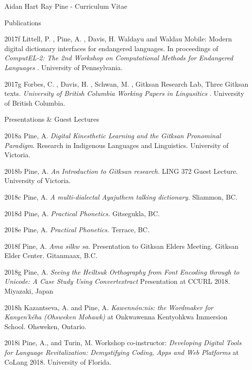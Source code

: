 \documentclass[12pt]{letter}
\begin{document}
\begin{cv}{ Aidan Hart Ray Pine  \space - \space   Curriculum Vitae}
\begin{cvlist}{Publications}
                                                            \item[2017f]  Littell,  P. ,  Pine,  A. ,  Davis,  H.   Waldayu and Waldau Mobile: Modern digital dictionary interfaces for endangered languages. In proceedings of \textit{ ComputEL-2: The 2nd Workshop on Computational Methods for Endangered Languages }. University of Pennsylvania.  
                                                            \item[2017g]  Forbes,  C. ,  Davis,  H. ,  Schwan,  M. ,  Gitksan Research Lab,    Three Gitksan texts. \textit{ University of British Columbia Working Papers in Lingusitics }. University of British Columbia.  
                                \end{cvlist}

        \begin{cvlist}{Presentations \& Guest Lectures}
            \item[2018a] Pine, A. \textit{Digital Kinesthetic Learning and the Gitksan Pronominal Paradigm}. Research in Indigenous Languages and Linguistics. University of Victoria.
            \item[2018b] Pine, A. \textit{An Introduction to Gitksan research.} LING 372 Guest Lecture. University of Victoria.
            \item[2018c] Pine, A. \textit{A multi-dialectal Ayajuthem talking dictionary.} Sliammon, BC.
            \item[2018d] Pine, A. \textit{Practical Phonetics.} Gitsegukla, BC.
            \item[2018e] Pine, A. \textit{Practical Phonetics.} Terrace, BC.
            \item[2018f] Pine, A. \textit{Ama silkw sa.} Presentation to Gitksan Elders Meeting. Gitksan Elder Center. Gitanmaax, B.C.
            \item[2018g] Pine, A. \textit{Seeing the Heiltsuk Orthography from Font Encoding through to Unicode: A Case Study Using Convertextract} Presentation at CCURL 2018. Miyazaki, Japan
            \item[2018h] Kazantseva, A. and Pine, A. \textit{Kawenn\'{o}n:nis: the Wordmaker for Kanyen'k\'{e}ha (Ohsweken Mohawk)} at Onkwawenna Kentyohkwa Immersion School. Ohsweken, Ontario.
            \item[2018i] Pine, A., and Turin, M. Workshop co-instructor: \textit{Developing Digital Tools for Language Revitalization: Demystifying Coding, Apps and Web Platforms} at CoLang 2018. University of Florida.

\end{cvlist}
\end{cv}
\end{document}
